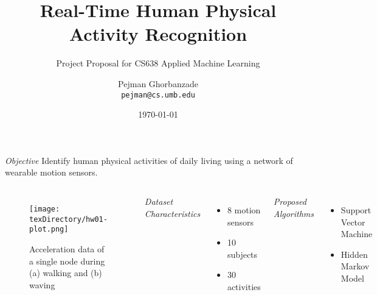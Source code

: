 \documentclass[compress]{beamer}
\date{\today}
\title{Real-Time Human Physical Activity Recognition}
\subtitle{Project Proposal for CS638 Applied Machine Learning}
\author[pejman]{Pejman Ghorbanzade\\ \texttt{pejman@cs.umb.edu}}
\institute[UMass]{Department of Computer Science\\ University of Massachusetts Boston}
\begin{document}
\begin{frame}
	\frametitle{\inserttitle}
	\framesubtitle{\insertsubtitle}

	\emph{Objective} Identify human physical activities of daily living using a network of wearable motion sensors.

	\begin{columns}

	\begin{figure}
	\texttt{[image: \\texDirectory/hw01-plot.png]}
	\caption{Acceleration data of a single node during (a) walking and (b) waving}
	\end{figure}


	\footnotesize

	\emph{Dataset Characteristics}
	\begin{itemize}[leftmargin=10pt]
	\item[] 8 motion sensors
	\item[] 10 subjects
	\item[] 30 activities
	\end{itemize}

	\emph{Proposed Algorithms}
	\begin{itemize}[leftmargin=10pt]
	\item[] Support Vector Machine
	\item[] Hidden Markov Model
	\end{itemize}

	\end{columns}

\end{frame}
\end{document}
